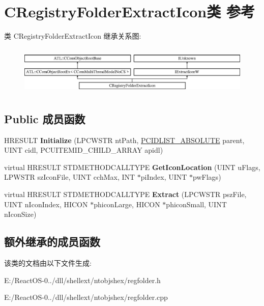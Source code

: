 \hypertarget{class_c_registry_folder_extract_icon}{}\section{C\+Registry\+Folder\+Extract\+Icon类 参考}
\label{class_c_registry_folder_extract_icon}
类 C\+Registry\+Folder\+Extract\+Icon 继承关系图\+:\begin{figure}[H]
\begin{center}
\leavevmode
\includegraphics[height=2.386364cm]{class_c_registry_folder_extract_icon}
\end{center}
\end{figure}
\subsection*{Public 成员函数}
\begin{DoxyCompactItemize}
\item 
\mbox{\label{class_c_registry_folder_extract_icon_a342af3e9f0fc4ab5d4c2bf32b55cc823}} 
H\+R\+E\+S\+U\+LT {\bfseries Initialize} (L\+P\+C\+W\+S\+TR nt\+Path, \hyperlink{struct___i_t_e_m_i_d_l_i_s_t___a_b_s_o_l_u_t_e}{P\+C\+I\+D\+L\+I\+S\+T\+\_\+\+A\+B\+S\+O\+L\+U\+TE} parent, U\+I\+NT cidl, P\+C\+U\+I\+T\+E\+M\+I\+D\+\_\+\+C\+H\+I\+L\+D\+\_\+\+A\+R\+R\+AY apidl)
\item 
\mbox{\label{class_c_registry_folder_extract_icon_a3c38385cf5d260019bb2a3dae1e7d212}} 
virtual H\+R\+E\+S\+U\+LT S\+T\+D\+M\+E\+T\+H\+O\+D\+C\+A\+L\+L\+T\+Y\+PE {\bfseries Get\+Icon\+Location} (U\+I\+NT u\+Flags, L\+P\+W\+S\+TR sz\+Icon\+File, U\+I\+NT cch\+Max, I\+NT $\ast$pi\+Index, U\+I\+NT $\ast$pw\+Flags)
\item 
\mbox{\label{class_c_registry_folder_extract_icon_a896d51c6045781a5274cecf0db35cd02}} 
virtual H\+R\+E\+S\+U\+LT S\+T\+D\+M\+E\+T\+H\+O\+D\+C\+A\+L\+L\+T\+Y\+PE {\bfseries Extract} (L\+P\+C\+W\+S\+TR psz\+File, U\+I\+NT n\+Icon\+Index, H\+I\+C\+ON $\ast$phicon\+Large, H\+I\+C\+ON $\ast$phicon\+Small, U\+I\+NT n\+Icon\+Size)
\end{DoxyCompactItemize}
\subsection*{额外继承的成员函数}


该类的文档由以下文件生成\+:\begin{DoxyCompactItemize}
\item 
E\+:/\+React\+O\+S-\/0../dll/shellext/ntobjshex/regfolder.\+h\item 
E\+:/\+React\+O\+S-\/0../dll/shellext/ntobjshex/regfolder.\+cpp\end{DoxyCompactItemize}
